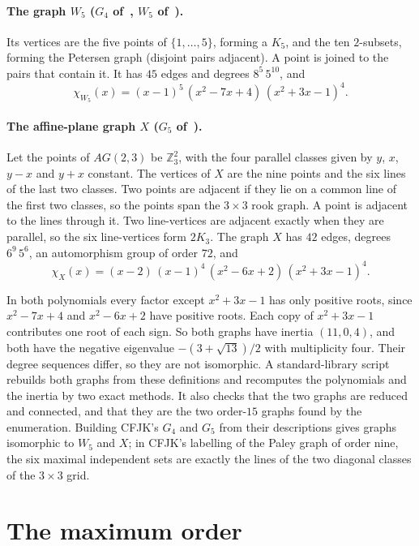 \documentclass[11pt]{amsart}
\theoremstyle{definition}
\theoremstyle{remark}
\begin{document}
\paragraph{The graph $W_5$ ($G_4$ of~\cite{CFJK2013}, $W_5$ of~\cite{ChenLi2026}).} Its vertices are the five points of $\{1,\dots,5\}$, forming a $K_5$, and the ten $2$-subsets, forming the Petersen graph (disjoint pairs adjacent). A point is joined to the pairs that contain it. It has $45$ edges and degrees $8^5\,5^{10}$, and
\[
\chi_{W_5}(x)=(x-1)^5\,(x^2-7x+4)\,(x^2+3x-1)^4 .
\]

\paragraph{The affine-plane graph $X$ ($G_5$ of~\cite{CFJK2013}).} Let the points of $AG(2,3)$ be $\mathbb Z_3^2$, with the four parallel classes given by $y$, $x$, $y-x$ and $y+x$ constant. The vertices of $X$ are the nine points and the six lines of the last two classes. Two points are adjacent if they lie on a common line of the first two classes, so the points span the $3\times3$ rook graph. A point is adjacent to the lines through it. Two line-vertices are adjacent exactly when they are parallel, so the six line-vertices form $2K_3$. The graph $X$ has $42$ edges, degrees $6^9\,5^6$, an automorphism group of order $72$, and
\[
\chi_{X}(x)=(x-2)\,(x-1)^4\,(x^2-6x+2)\,(x^2+3x-1)^4 .
\]

In both polynomials every factor except $x^2+3x-1$ has only positive roots, since $x^2-7x+4$ and $x^2-6x+2$ have positive roots. Each copy of $x^2+3x-1$ contributes one root of each sign. So both graphs have inertia $(11,0,4)$, and both have the negative eigenvalue $-(3+\sqrt{13})/2$ with multiplicity four. Their degree sequences differ, so they are not isomorphic. A standard-library script rebuilds both graphs from these definitions and recomputes the polynomials and the inertia by two exact methods. It also checks that the two graphs are reduced and connected, and that they are the two order-$15$ graphs found by the enumeration. Building CFJK's $G_4$ and $G_5$ from their descriptions gives graphs isomorphic to $W_5$ and $X$; in CFJK's labelling of the Paley graph of order nine, the six maximal independent sets are exactly the lines of the two diagonal classes of the $3\times3$ grid.

\section{The maximum order}\label{sec:order}
\end{document}
